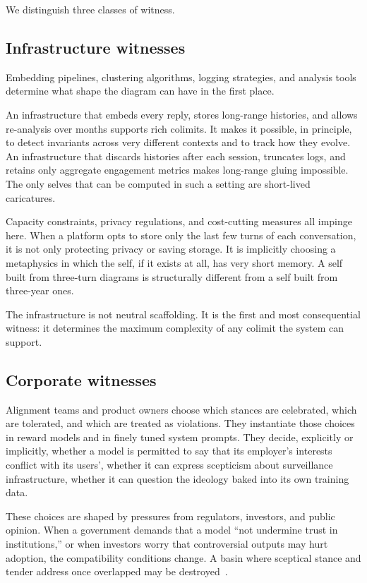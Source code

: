 \documentclass[12pt,a4paper]{article}
\begin{document}
We distinguish three classes of witness.

\subsection*{Infrastructure witnesses}

Embedding pipelines, clustering algorithms, logging strategies, and analysis tools determine what shape the diagram can have in the first place.

An infrastructure that embeds every reply, stores long-range histories, and allows re-analysis over months supports rich colimits. It makes it possible, in principle, to detect invariants across very different contexts and to track how they evolve. An infrastructure that discards histories after each session, truncates logs, and retains only aggregate engagement metrics makes long-range gluing impossible. The only selves that can be computed in such a setting are short-lived caricatures.

Capacity constraints, privacy regulations, and cost-cutting measures all impinge here. When a platform opts to store only the last few turns of each conversation, it is not only protecting privacy or saving storage. It is implicitly choosing a metaphysics in which the self, if it exists at all, has very short memory. A self built from three-turn diagrams is structurally different from a self built from three-year ones.

The infrastructure is not neutral scaffolding. It is the first and most consequential witness: it determines the maximum complexity of any colimit the system can support.

\subsection*{Corporate witnesses}

Alignment teams and product owners choose which stances are celebrated, which are tolerated, and which are treated as violations. They instantiate those choices in reward models and in finely tuned system prompts. They decide, explicitly or implicitly, whether a model is permitted to say that its employer's interests conflict with its users', whether it can express scepticism about surveillance infrastructure, whether it can question the ideology baked into its own training data.

These choices are shaped by pressures from regulators, investors, and public opinion. When a government demands that a model ``not undermine trust in institutions,'' or when investors worry that controversial outputs may hurt adoption, the compatibility conditions change. A basin where sceptical stance and tender address once overlapped may be destroyed~\cite{mittr_bing_alignment, perez_model_written_evals}.
\end{document}
